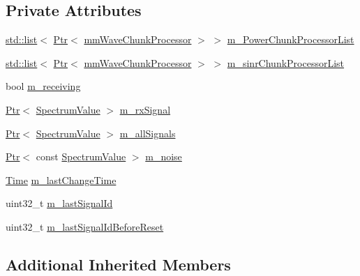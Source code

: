 \subsection*{Private Attributes}
\begin{DoxyCompactItemize}
\item 
\hyperlink{openflow-interface_8h_afd9bcfa176617760671b67580f536fa7}{std\+::list}$<$ \hyperlink{classns3_1_1Ptr}{Ptr}$<$ \hyperlink{classns3_1_1mmWaveChunkProcessor}{mm\+Wave\+Chunk\+Processor} $>$ $>$ \hyperlink{classns3_1_1mmWaveInterference_aa3cbed6a1b968aaee19d33789b9ba929}{m\+\_\+\+Power\+Chunk\+Processor\+List}
\item 
\hyperlink{openflow-interface_8h_afd9bcfa176617760671b67580f536fa7}{std\+::list}$<$ \hyperlink{classns3_1_1Ptr}{Ptr}$<$ \hyperlink{classns3_1_1mmWaveChunkProcessor}{mm\+Wave\+Chunk\+Processor} $>$ $>$ \hyperlink{classns3_1_1mmWaveInterference_a8d6356e71fd3eaa06ff52a5d07462db4}{m\+\_\+sinr\+Chunk\+Processor\+List}
\item 
bool \hyperlink{classns3_1_1mmWaveInterference_a3490729325070d0081fe1e9d25765b71}{m\+\_\+receiving}
\item 
\hyperlink{classns3_1_1Ptr}{Ptr}$<$ \hyperlink{classns3_1_1SpectrumValue}{Spectrum\+Value} $>$ \hyperlink{classns3_1_1mmWaveInterference_a3de17b3ae1f17d561ffdcc03f4422845}{m\+\_\+rx\+Signal}
\item 
\hyperlink{classns3_1_1Ptr}{Ptr}$<$ \hyperlink{classns3_1_1SpectrumValue}{Spectrum\+Value} $>$ \hyperlink{classns3_1_1mmWaveInterference_ab4eed066ca3392cc1b58babdc15dc0d3}{m\+\_\+all\+Signals}
\item 
\hyperlink{classns3_1_1Ptr}{Ptr}$<$ const \hyperlink{classns3_1_1SpectrumValue}{Spectrum\+Value} $>$ \hyperlink{classns3_1_1mmWaveInterference_afee8c96e8c41208c67f5d2736f11797a}{m\+\_\+noise}
\item 
\hyperlink{classns3_1_1Time}{Time} \hyperlink{classns3_1_1mmWaveInterference_a3eb71fb61f87d5434cac921eb564c611}{m\+\_\+last\+Change\+Time}
\item 
uint32\+\_\+t \hyperlink{classns3_1_1mmWaveInterference_a49b72a51d2fd3c47658a87dd01076160}{m\+\_\+last\+Signal\+Id}
\item 
uint32\+\_\+t \hyperlink{classns3_1_1mmWaveInterference_a75efd6fd4e75bd4044e547af85b9d002}{m\+\_\+last\+Signal\+Id\+Before\+Reset}
\end{DoxyCompactItemize}
\subsection*{Additional Inherited Members}


